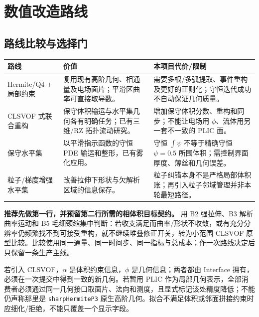 \documentclass[11pt,a4paper]{article}
\newcommand{\code}[1]{{\small\nolinkurl{#1}}}
\begin{document}
\section{数值改造路线}
\subsection{路线比较与选择门}
\begin{longtable}{L{31mm}L{61mm}L{54mm}}
\toprule 路线 & 价值 & 本项目代价/限制\\\midrule\endhead
Hermite/Q4 + 局部约束 & 复用现有高阶几何、相通量及电场面片；平滑区曲率可直接取导数。 & 需要多根/多弧提取、事件重构及更好的正则化；守恒迭代成功不自动保证几何质量。\\
CLSVOF 式联合重构 & 保守体积输运与水平集几何各有明确任务；已有三维/RZ 拓扑流动研究\cite{sussman2000}。 & 增加保守体积分数、重构和同步；不能让电场用 $\phi$、流体用另一套不一致的 PLIC 面。\\
保守水平集 & 以平滑指示函数的守恒 PDE 输运和整形，已有雾化应用\cite{olsson2005,desjardins2008}。 & 守恒 $\int\psi$ 不等于精确守恒 $\psi=0.5$ 所围体积；需控制界面厚度、薄丝和几何误差。\\
粒子/梯度增强水平集 & 改善拉伸下形状与欠解析区域的信息保存\cite{enright2002,nave2010}。 & 粒子纠错本身不是严格局部体积账；再引入粒子邻域管理并非本轮最短路径。\\\bottomrule
\end{longtable}

\textbf{推荐先做第一行，并预留第二行所需的相体积目标契约。} 用 B2 强拉伸、B3 解析曲率运动和 B5 毛细颈缩集中判断：若收支满足而曲率/形状不收敛，或有充分分辨率仍频繁找不到可接受重构，就不继续堆叠修正开关，转为小范围 CLSVOF 原型比较。比较使用同一通量、同一时间步、同一指标与总成本；作一次路线决定后只保留一条生产主线。

若引入 CLSVOF，$\alpha$ 是体积约束信息，$\phi$ 是几何信息；两者都由 Interface 拥有，必须在一次提交中得到一致的新几何。若暂用 PLIC 作为局部几何表示，全部消费者必须通过同一几何接口取面片、法向和测度，且显式标记该处精度降低；不能仍声称那里是 \code{sharpHermiteP3} 原生高阶几何。拟合不满足体积或邻面拼接约束时应细化/拒绝，不能只覆盖一个显示字段。
\end{document}
